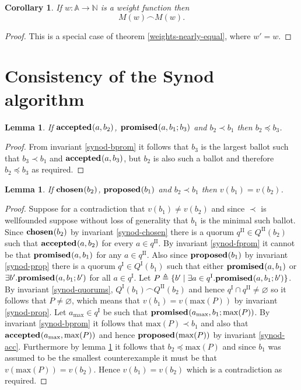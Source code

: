 \documentclass[journal]{IEEEtran}
\newtheorem{lemma}[theorem]{Lemma}
\newtheorem{corollary}[theorem]{Corollary}
\begin{document}
\begin{corollary} \label{weights-equal} If $w : \mathbb A \to \mathbb N$ is a
weight function then \[M(w) \frown M(w).\]  \end{corollary}

\begin{proof} This is a special case of theorem \ref{weights-nearly-equal},
where $w' = w$.  \end{proof}


\section{Consistency of the Synod algorithm}
\label{synod-safety}

\begin{lemma}\label{synod-acc-bprom}If $\mathbf{accepted}_{}(a,b_2)$,
$\mathbf{promised}_{}(a,b_1;b_3)$ and $b_2 \prec b_1$ then $b_2 \preceq b_3$.\end{lemma}

\begin{proof} From invariant \ref{synod-bprom} it follows that $b_3$ is the
largest ballot such that $b_3 \prec b_1$ and $\mathbf{accepted}_{}(a,b_3)$, but $b_2$ is
also such a ballot and therefore $b_2 \preceq b_3$ as required.  \end{proof}

\begin{lemma}\label{synod-lemma} If $\mathbf{chosen}_{}(b_2)$, $\mathbf{proposed}_{}(b_1)$ and $b_2
\prec b_1$ then $v(b_1) = v(b_2)$. \end{lemma}

\begin{proof}Suppose for a contradiction that $v(b_1) \ne v(b_2)$ and since
$\prec$ is wellfounded suppose without loss of generality that $b_1$ is the
minimal such ballot.  Since $\mathbf{chosen}_{}(b_2)$ by invariant \ref{synod-chosen}
there is a quorum $q^\textrm{II} \in Q^\textrm{II}(b_2)$ such that
$\mathbf{accepted}_{}(a,b_2)$ for every $a \in q^\textrm{II}$.  By invariant
\ref{synod-fprom} it cannot be that $\mathbf{promised}_{}(a,b_1)$ for any $a \in
q^\textrm{II}$.  Also since $\mathbf{proposed}_{}(b_1)$ by invariant \ref{synod-prop} there
is a quorum $q^\textrm{I} \in Q^\textrm{I}(b_1)$ such that either
$\mathbf{promised}_{}(a,b_1)$ or $\exists b'.  \mathbf{promised}_{}(a,b_1;b')$ for all $a \in
q^\textrm{I}$.  Let $P \triangleq \{ b' \mid \exists a \in q^\textrm{I}.
\mathbf{promised}_{}(a,b_1;b') \}$.  By invariant \ref{synod-quorums},
${Q^\textrm{I}(b_1) \frown Q^\textrm{II}(b_2)}$ and hence $q^\textrm{I} \cap
q^\textrm{II} \ne \varnothing$ so it follows that $P \ne \varnothing$, which
means that $v(b_1) = v(\mathrm{max}(P))$ by invariant \ref{synod-prop}. Let
$a_{\mathrm{max}} \in q^\textrm{I}$ be such that
$\mathbf{promised}_{}(a_{\mathrm{max}},b_1;\mathrm{max}(P))$.  By invariant
\ref{synod-bprom} it follows that $\mathrm{max}(P) \prec b_1$ and also that
$\mathbf{accepted}_{}(a_{\mathrm{max}},\mathrm{max}(P))$ and hence
$\mathbf{proposed}_{}(\mathrm{max}(P))$ by invariant \ref{synod-acc}. Furthermore by lemma
\ref{synod-acc-bprom} it follows that $b_2 \preceq \mathrm{max}(P)$ and since
$b_1$ was assumed to be the smallest counterexample it must be that
$v(\mathrm{max}(P)) = v(b_2)$.  Hence $v(b_1) = v(b_2)$ which is a
contradiction as required.  \end{proof}
\end{document}
